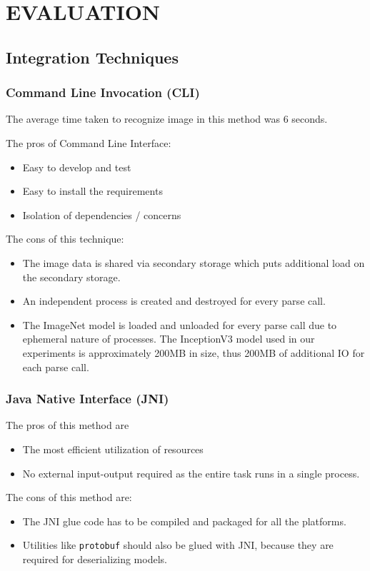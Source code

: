 \section {EVALUATION} \label{sec:evaluation}
\subsection{Integration Techniques}
\subsubsection{Command Line Invocation (CLI)} \label{sec:eval-cli}
The average time taken to recognize image in this method was 6 seconds.

The pros of Command Line Interface:
\begin{itemize}
\item Easy to develop and test
\item Easy to install the requirements
\item Isolation of dependencies / concerns
\end{itemize}

The cons of this technique:
\begin{itemize}
\item The image data is shared via secondary storage which puts additional load on the secondary storage.
\item An independent process is created and destroyed for every parse call.
\item The ImageNet model is loaded and unloaded for every parse call due to ephemeral nature of processes. The InceptionV3 model used in our experiments is approximately 200MB in size, thus 200MB of additional IO for each parse call.
\end{itemize}

\subsubsection{Java Native Interface (JNI)} \label{sec:eval-jni}

The pros of this method are
\begin{itemize}
\item The most efficient utilization of resources
\item No external input-output required as the entire task runs in a single process.
\end{itemize}

The cons of this method are:
\begin{itemize}
  \item The JNI glue code has to be compiled and packaged for all the platforms.
  \item Utilities like \texttt{protobuf} should also be glued with JNI, because they are required for deserializing models\cite{javacpp-240}.
\end{itemize}

